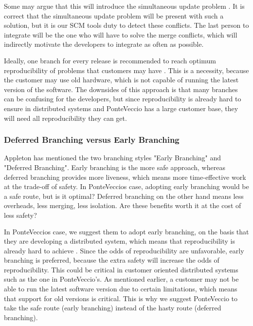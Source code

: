 \documentclass[10pt]{article}
\begin{document}
\noindent Some may argue that this will introduce the simultaneous update problem \cite{Babich}. It is correct that the simultaneous update problem will be present with such a solution, but it is our SCM tools duty to detect these conflicts. The last person to integrate will be the one who will have to solve the merge conflicts, which will indirectly motivate the developers to integrate as often as possible.

\noindent Ideally, one branch for every release is recommended to reach optimum reproducibility of problems that customers may have \cite{Vance}. This is a necessity, because the customer may use old hardware, which is not capable of running the latest version of the software. The downsides of this approach is that many branches can be confusing for the developers, but since reproducibility is already hard to ensure in distributed systems and PonteVeccio has a large customer base, they will need all reproducibility they can get.

\subsubsection{Deferred Branching versus Early Branching}
\noindent Appleton \cite{Appleton} has mentioned the two branching styles "Early Branching" and "Deferred Branching". Early branching is the more safe approach, whereas deferred branching provides more liveness\cite{Appleton}, which means more time-effective work at the trade-off of safety. In PonteVeccios case, adopting early branching would be a safe route, but is it optimal? Deferred branching on the other hand means less overheads, less merging, less isolation. Are these benefits worth it at the cost of less safety? 

\noindent In PonteVeccios case, we suggest them to adopt early branching, on the basis that they are developing a distributed system, which means that reproducibility is already hard to achieve \cite{Bays}. Since the odds of reproducibility are unfavorable, early branching is preferred, because the extra safety will increase the odds of reproducibility. This could be critical in customer oriented distributed systems such as the one in PonteVeccio's. As mentioned earlier, a customer may not be able to run the latest software version due to certain limitations, which means that support for old versions is critical. This is why we suggest PonteVeccio to take the safe route (early branching) instead of the hasty route (deferred branching).
\end{document}
